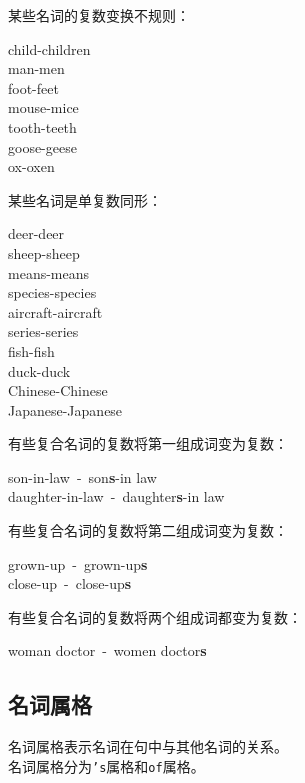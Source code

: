 \documentclass[UTF8]{ctexart}
\begin{document}
\newpage

    某些名词的复数变换不规则：
    \begin{center}
        \ttfamily
        child-children\\[2mm]
        man-men\\[2mm]
        foot-feet\\[2mm]
        mouse-mice\\[2mm]
        tooth-teeth\\[2mm]
        goose-geese\\[2mm]
        ox-oxen\\[6mm]
    \end{center}
    某些名词是单复数同形：
    \begin{center}
        \ttfamily
        deer-deer\\[2mm]
        sheep-sheep\\[2mm]
        means-means\\[2mm]
        species-species\\[2mm]
        aircraft-aircraft\\[2mm]
        series-series\\[2mm]
        fish-fish\\[2mm]
        duck-duck\\[2mm]
        Chinese-Chinese\\[2mm]
        Japanese-Japanese\\[8mm]
    \end{center}
    有些复合名词的复数将第一组成词变为复数：
    \begin{center}
        \ttfamily
        son-in-law~-~son\textbf{s}-in law\\[3mm]
        daughter-in-law~-~daughter\textbf{s}-in law\\[6mm]
    \end{center}
    有些复合名词的复数将第二组成词变为复数：
    \begin{center}
        \ttfamily
        grown-up~-~grown-up\textbf{s}\\[3mm]
        close-up~-~close-up\textbf{s}\\[6mm]
    \end{center}
    有些复合名词的复数将两个组成词都变为复数：
    \begin{center}
        \ttfamily
        woman doctor~-~women doctor\textbf{s}
    \end{center}

\newpage

\subsection{名词属格}
    名词属格表示名词在句中与其他名词的关系。\\[3mm]
    名词属格分为\texttt{'s\hspace{2pt}}属格和\texttt{\hspace{3pt}of}属格。
\end{document}
